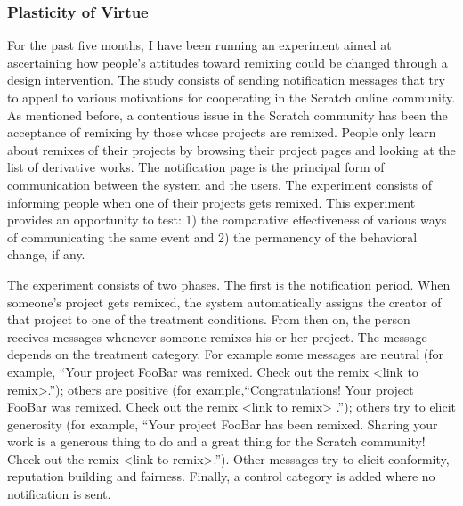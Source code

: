
\subsubsection{Plasticity of Virtue}

For the past five months, I have been running an experiment aimed at ascertaining how people's attitudes toward remixing could be changed through a design intervention.
The study consists of sending notification messages that try to appeal to various motivations for cooperating in the Scratch online community. 
As mentioned before, a contentious issue in the Scratch community has been the acceptance of remixing by those whose projects are remixed. 
People only learn about remixes of their projects by browsing their project pages and looking at the list of derivative works. 
The notification page is the principal form of communication between the system and the users.
The experiment consists of informing people when one of their projects gets remixed.
This experiment provides an opportunity to test: 1) the comparative effectiveness of various ways of communicating the same event and 2) the permanency of the behavioral change, if any. 

The experiment consists of two phases.
The first is the notification period. 
When someone's project gets remixed, the system automatically assigns the creator of that project to one of the treatment conditions. 
From then on, the person receives messages whenever someone remixes his or her project. The message depends on the treatment category.
For example some messages are neutral (for example, ``Your project FooBar was remixed. Check out the remix <link to remix>.''); 
others are positive (for example,``Congratulations! Your project FooBar was remixed. Check out the remix <link to remix> .'');
others try to elicit generosity (for example, ``Your project FooBar has been remixed. Sharing your work is a generous thing to do and a great thing for the Scratch community! Check out the remix <link to remix>.'').
Other messages try to elicit conformity, reputation building and fairness.
Finally, a control category is added where no notification is sent.

